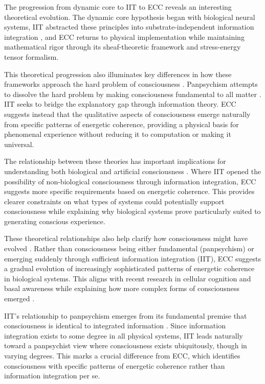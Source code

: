 The progression from dynamic core to IIT to ECC reveals an interesting theoretical evolution. The dynamic core hypothesis began with biological neural systems, IIT abstracted these principles into substrate-independent information integration \cite{Tononi2015}, and ECC returns to physical implementation while maintaining mathematical rigor through its sheaf-theoretic framework and stress-energy tensor formalism.

This theoretical progression also illuminates key differences in how these frameworks approach the hard problem of consciousness \cite{Chalmers2015}. Panpsychism attempts to dissolve the hard problem by making consciousness fundamental to all matter \cite{Strawson2006}. IIT seeks to bridge the explanatory gap through information theory. ECC suggests instead that the qualitative aspects of consciousness emerge naturally from specific patterns of energetic coherence, providing a physical basis for phenomenal experience without reducing it to computation or making it universal.

The relationship between these theories has important implications for understanding both biological and artificial consciousness \cite{Koch2019}. Where IIT opened the possibility of non-biological consciousness through information integration, ECC suggests more specific requirements based on energetic coherence. This provides clearer constraints on what types of systems could potentially support consciousness while explaining why biological systems prove particularly suited to generating conscious experience.

These theoretical relationships also help clarify how consciousness might have evolved \cite{Goff2019}. Rather than consciousness being either fundamental (panpsychism) or emerging suddenly through sufficient information integration (IIT), ECC suggests a gradual evolution of increasingly sophisticated patterns of energetic coherence in biological systems. This aligns with recent research in cellular cognition and basal awareness while explaining how more complex forms of consciousness emerged \cite{Mathews2011}.

IIT's relationship to panpsychism emerges from its fundamental premise that consciousness is identical to integrated information \cite{Tononi2016}. Since information integration exists to some degree in all physical systems, IIT leads naturally toward a panpsychist view where consciousness exists ubiquitously, though in varying degrees. This marks a crucial difference from ECC, which identifies consciousness with specific patterns of energetic coherence rather than information integration per se.

